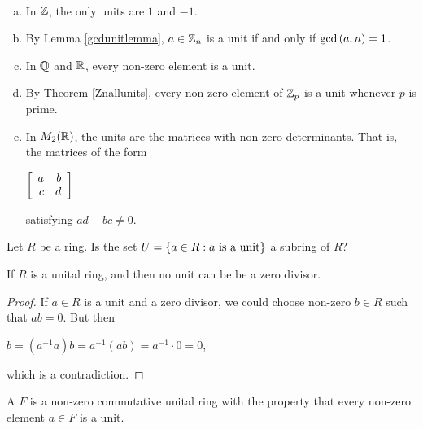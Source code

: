 \documentclass[11pt,fleqn,dvipsnames,usenames]{article}
\begin{document}
%
\begin{examples}~
\begin{enumerate}[(a)]
\item In $\Z$, the only units are $1$ and $-1$.
\item By Lemma \ref{gcdunitlemma}, $a\in \ZN$ is a unit if and only if $\GCD{a,n} = 1$.
\item In $\RATIONAL$ and $\REAL$, every non-zero element is a unit.
\item By Theorem \ref{Znallunits}, every non-zero element of $\Z_p$ is a unit whenever $p$ is prime.
\item In $M_{2}(\REAL)$, the units are the matrices with non-zero determinants.  That is, the matrices of the form
\begin{center}
$\MATRIX{rr}{a & b\\c & d}$
\end{center}
satisfying $ad - bc \neq 0$.
\end{enumerate}
\end{examples}
%
\begin{exercise}
Let $R$ be a ring.  Is the set $U=\SET{a\in R:a\text{ is a unit}}$ a subring of $R$?
\end{exercise}
%
\begin{lemma}\label{unitscantbezerodivisors}
If $R$ is a unital ring, and then no unit can be be a zero divisor.
\end{lemma}
%
\begin{proof}
If $a\in R$ is a unit and a zero divisor, we could choose non-zero $b\in R$ such that $ab = 0$.  But then
\begin{center}
$b = (a^{-1}a)b = a^{-1}(ab) = a^{-1}\cdot 0 = 0$,
\end{center}
which is a contradiction.
\end{proof}
%
\begin{definition}
A  $F$ is a non-zero commutative unital ring with the property that every non-zero element $a\in F$ is a unit.
\end{definition}
%
\end{document}
